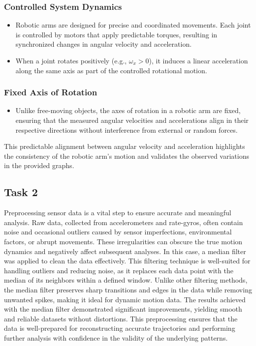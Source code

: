 \documentclass[12pt]{article}
\begin{document}
\subsubsection*{Controlled System Dynamics}
\begin{itemize}
    \item Robotic arms are designed for precise and coordinated movements. Each joint is controlled by motors that apply predictable torques, resulting in synchronized changes in angular velocity and acceleration.
    \item When a joint rotates positively (e.g., \(\omega_x > 0\)), it induces a linear acceleration along the same axis as part of the controlled rotational motion.
\end{itemize}

\subsubsection*{Fixed Axis of Rotation}
\begin{itemize}
    \item Unlike free-moving objects, the axes of rotation in a robotic arm are fixed, ensuring that the measured angular velocities and accelerations align in their respective directions without interference from external or random forces.
\end{itemize}

This predictable alignment between angular velocity and acceleration highlights the consistency of the robotic arm's motion and validates the observed variations in the provided graphs.



\subsection{Task 2}

Preprocessing sensor data is a vital step to ensure accurate and meaningful analysis. Raw data, collected from accelerometers and rate-gyros, often contain noise and occasional outliers caused by sensor imperfections, environmental factors, or abrupt movements. These irregularities can obscure the true motion dynamics and negatively affect subsequent analyses.
In this case, a median filter was applied to clean the data effectively. This filtering technique is well-suited for handling outliers and reducing noise, as it replaces each data point with the median of its neighbors within a defined window. Unlike other filtering methods, the median filter preserves sharp transitions and edges in the data while removing unwanted spikes, making it ideal for dynamic motion data.
The results achieved with the median filter demonstrated significant improvements, yielding smooth and reliable datasets without distortions. This preprocessing ensures that the data is well-prepared for reconstructing accurate trajectories and performing further analysis with confidence in the validity of the underlying patterns.
\end{document}
